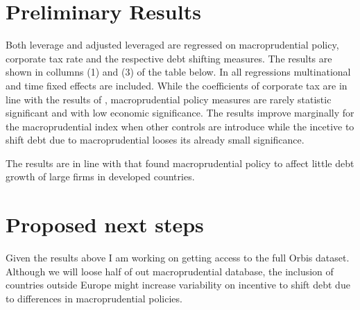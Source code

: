 \documentclass[12pt,runningheads]{article}
\begin{document}
\break

\section{Preliminary Results}
Both leverage and adjusted leveraged are regressed on macroprudential policy, corporate tax rate and the respective debt shifting measures. The results are shown in collumns (1) and (3) of the table below. In all regressions multinational and time fixed effects are included. While the coefficients of corporate tax are in line with the results of \cite{huizinga2008capital}, macroprudential policy measures are rarely statistic significant and with low economic significance. The results improve marginally for the macroprudential index when other controls are introduce while the incetive to shift debt due to macroprudential looses its already small significance. 

The results are in line with \cite{beck2004bank} that found macroprudential policy to affect little debt growth of large firms in developed countries. 
\begin{figure}	
\scalebox{0.75}{}
\end{figure}

\section{Proposed next steps}
Given the results above I am working on getting access to the full Orbis dataset. Although we will loose half of out macroprudential database, the inclusion of countries outside Europe might increase variability on incentive to shift debt due to differences in macroprudential policies.

%







\end{document}
